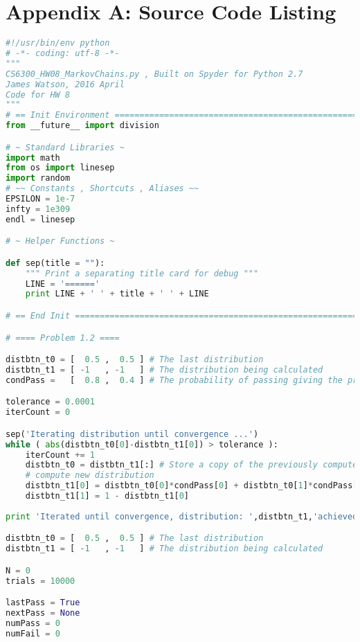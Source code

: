 \documentclass[fleqn]{hw8}
\begin{document}
\section{Appendix A: Source Code Listing}
\begin{lstlisting}[language=python]
#!/usr/bin/env python
# -*- coding: utf-8 -*-
"""
CS6300_HW08_MarkovChains.py , Built on Spyder for Python 2.7
James Watson, 2016 April
Code for HW 8
"""
# == Init Environment ==================================================================================
from __future__ import division

# ~ Standard Libraries ~
import math
from os import linesep
import random
# ~~ Constants , Shortcuts , Aliases ~~
EPSILON = 1e-7
infty = 1e309 
endl = linesep

# ~ Helper Functions ~

def sep(title = ""):
    """ Print a separating title card for debug """
    LINE = '======'
    print LINE + ' ' + title + ' ' + LINE

# == End Init ==========================================================================================

# ==== Problem 1.2 ====

distbtn_t0 = [  0.5 ,  0.5 ] # The last distribution
distbtn_t1 = [ -1   , -1   ] # The distribution being calculated
condPass =   [  0.8 ,  0.4 ] # The probability of passing giving the previous state [pass,fail]

tolerance = 0.0001
iterCount = 0

sep('Iterating distribution until convergence ...')
while ( abs(distbtn_t0[0]-distbtn_t1[0]) > tolerance ):
    iterCount += 1
    distbtn_t0 = distbtn_t1[:] # Store a copy of the previously computed distribution to t0
    # compute new distribution
    distbtn_t1[0] = distbtn_t0[0]*condPass[0] + distbtn_t0[1]*condPass[1]
    distbtn_t1[1] = 1 - distbtn_t1[0]
    
print 'Iterated until convergence, distribution: ',distbtn_t1,'achieved after',iterCount,'iterations.', endl

distbtn_t0 = [  0.5 ,  0.5 ] # The last distribution
distbtn_t1 = [ -1   , -1   ] # The distribution being calculated

N = 0
trials = 10000

lastPass = True
nextPass = None
numPass = 0
numFail = 0


\end{lstlisting}
\end{document}
